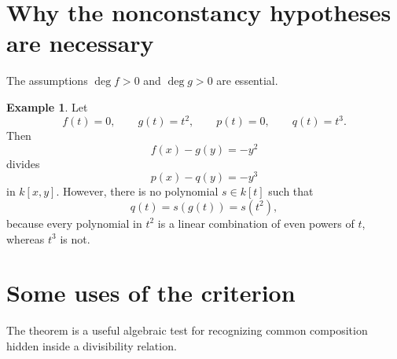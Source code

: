 \documentclass[11pt]{article}
\theoremstyle{plain}
\theoremstyle{definition}
\newtheorem{example}[theorem]{Example}
\theoremstyle{remark}
\begin{document}
\section{Why the nonconstancy hypotheses are necessary}

The assumptions \(\deg f>0\) and \(\deg g>0\) are essential.

\begin{example}
Let
\[
    f(t)=0,
    \qquad
    g(t)=t^2,
    \qquad
    p(t)=0,
    \qquad
    q(t)=t^3.
\]
Then
\[
    f(x)-g(y)=-y^2
\]
divides
\[
    p(x)-q(y)=-y^3
\]
in \(k[x,y]\). However, there is no polynomial \(s\in k[t]\) such that
\[
    q(t)=s(g(t))=s(t^2),
\]
because every polynomial in \(t^2\) is a linear combination of even powers of \(t\), whereas \(t^3\) is not.
\end{example}

\section{Some uses of the criterion}

The theorem is a useful algebraic test for recognizing common composition hidden inside a divisibility relation.
\end{document}
